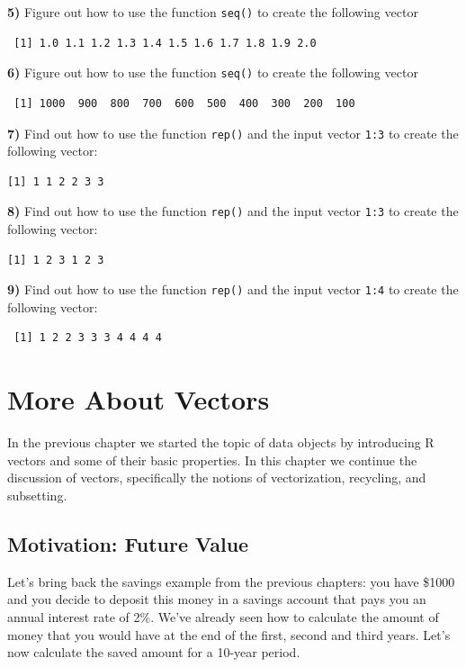 \documentclass[
]{book}
\begin{document}
\textbf{5)} Figure out how to use the function \texttt{seq()} to create the following vector

\begin{verbatim}
 [1] 1.0 1.1 1.2 1.3 1.4 1.5 1.6 1.7 1.8 1.9 2.0
\end{verbatim}

\textbf{6)} Figure out how to use the function \texttt{seq()} to create the following vector

\begin{verbatim}
 [1] 1000  900  800  700  600  500  400  300  200  100
\end{verbatim}

\textbf{7)} Find out how to use the function \texttt{rep()} and the input vector \texttt{1:3} to
create the following vector:

\begin{verbatim}
[1] 1 1 2 2 3 3
\end{verbatim}

\textbf{8)} Find out how to use the function \texttt{rep()} and the input vector \texttt{1:3} to
create the following vector:

\begin{verbatim}
[1] 1 2 3 1 2 3
\end{verbatim}

\textbf{9)} Find out how to use the function \texttt{rep()} and the input vector \texttt{1:4} to
create the following vector:

\begin{verbatim}
 [1] 1 2 2 3 3 3 4 4 4 4
\end{verbatim}

\hypertarget{vectors4}{%
\chapter{More About Vectors}\label{vectors4}}

In the previous chapter we started the topic of data objects by introducing
R vectors and some of their basic properties. In this chapter we continue the
discussion of vectors, specifically the notions of vectorization, recycling,
and subsetting.

\hypertarget{motivation-future-value}{%
\section{Motivation: Future Value}\label{motivation-future-value}}

Let's bring back the savings example from the previous chapters: you have \$1000
and you decide to deposit this money in a savings account that pays you an
annual interest rate of 2\%. We've already seen how to calculate the amount of
money that you would have at the end of the first, second and third years. Let's
now calculate the saved amount for a 10-year period.
\end{document}
